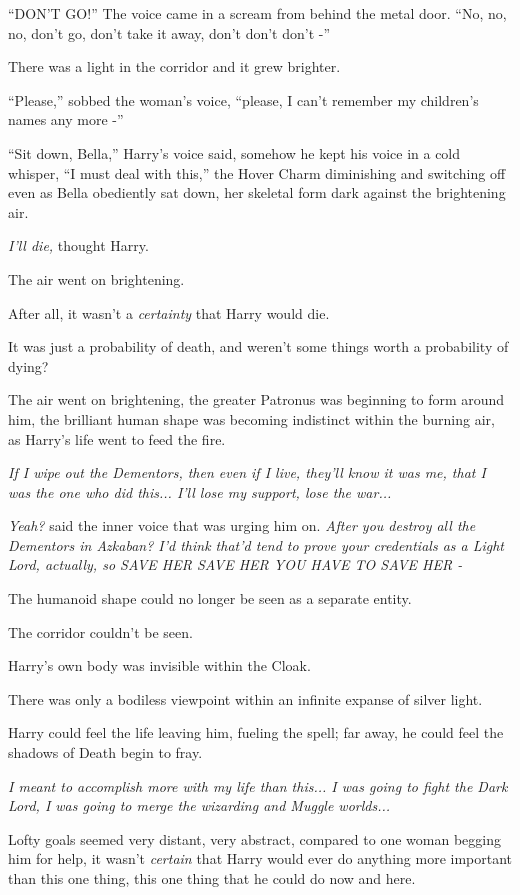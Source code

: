 ``DON'T GO!'' The voice came in a scream from behind the metal door.
``No, no, no, don't go, don't take it away, don't don't don't -''

There was a light in the corridor and it grew brighter.

``Please,'' sobbed the woman's voice, ``please, I can't remember my
children's names any more -''

``Sit down, Bella,'' Harry's voice said, somehow he kept his voice in a
cold whisper, ``I must deal with this,'' the Hover Charm diminishing and
switching off even as Bella obediently sat down, her skeletal form dark
against the brightening air.

\emph{I'll die,} thought Harry.

The air went on brightening.

After all, it wasn't a \emph{certainty} that Harry would die.

It was just a probability of death, and weren't some things worth a
probability of dying?

The air went on brightening, the greater Patronus was beginning to form
around him, the brilliant human shape was becoming indistinct within the
burning air, as Harry's life went to feed the fire.

\emph{If I wipe out the Dementors, then even if I live, they'll know it
was me, that I was the one who did this... I'll lose my support,
lose the war...}

\emph{Yeah?} said the inner voice that was urging him on. \emph{After
you destroy all the Dementors in Azkaban? I'd think that'd tend to prove
your credentials as a Light Lord, actually, so SAVE HER SAVE HER YOU
HAVE TO SAVE HER -}

The humanoid shape could no longer be seen as a separate entity.

The corridor couldn't be seen.

Harry's own body was invisible within the Cloak.

There was only a bodiless viewpoint within an infinite expanse of silver
light.

Harry could feel the life leaving him, fueling the spell; far away, he
could feel the shadows of Death begin to fray.

\emph{I meant to accomplish more with my life than this... I was
going to fight the Dark Lord, I was going to merge the wizarding and
Muggle worlds...}

Lofty goals seemed very distant, very abstract, compared to one woman
begging him for help, it wasn't \emph{certain} that Harry would ever do
anything more important than this one thing, this one thing that he
could do now and here.

